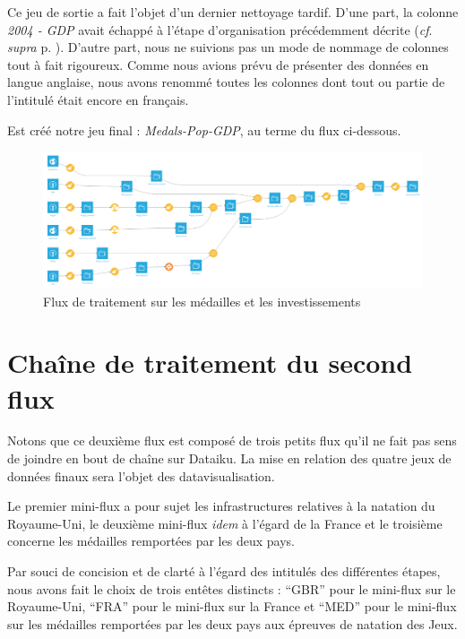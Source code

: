 \documentclass[hidelinks, 12pt]{report}
\begin{document}
Ce jeu de sortie a fait l'objet d'un dernier nettoyage tardif. D'une part, la colonne \textit{2004 - GDP} avait échappé à l'étape d'organisation précédemment décrite (\textit{cf}. \textit{supra} p. \pageref{orga}). D'autre part, nous ne suivions pas un mode de nommage de colonnes tout à fait rigoureux. Comme nous avions prévu de présenter des données en langue anglaise, nous avons renommé toutes les colonnes dont tout ou partie de l'intitulé était encore en français.

Est créé notre jeu final : \textit{Medals-Pop-GDP}, au terme du flux ci-dessous.

\begin{center}
	\begin{figure}[H]
		\centering
		\setlength{\belowcaptionskip}{-35pt}
		\includegraphics[scale=0.35]{images/flow-medals-full.png}
		\caption{Flux de traitement sur les médailles et les investissements}
	\end{figure}
\end{center}





%





\section{Chaîne de traitement du second flux}

Notons que ce deuxième flux est composé de trois petits flux qu'il ne fait pas sens de joindre en bout de chaîne sur Dataiku. La mise en relation des quatre jeux de données finaux sera l'objet des datavisualisation.

Le premier mini-flux a pour sujet les infrastructures relatives à la natation du Royaume-Uni, le deuxième mini-flux \textit{idem} à l'égard de la France et le troisième concerne les médailles remportées par les deux pays.

Par souci de concision et de clarté à l'égard des intitulés des différentes étapes, nous avons fait le choix de trois entêtes distincts : \enquote{GBR} pour le mini-flux sur le Royaume-Uni, \enquote{FRA} pour le mini-flux sur la France et \enquote{MED} pour le mini-flux sur les médailles remportées par les deux pays aux épreuves de natation des Jeux.
\end{document}
